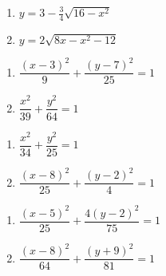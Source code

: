 \documentclass{ximera}
\begin{document}
\begin{multicols}{2}
\begin{enumerate}
\setcounter{enumi}{\value{HW}}

\item $y = 3 - \frac{3}{4} \sqrt{16-x^2}$

\item  $y = 2 \sqrt{8x-x^2-12}$ 

\setcounter{HW}{\value{enumi}}
\end{enumerate}
\end{multicols}

\begin{multicols}{2}
\begin{enumerate}
\setcounter{enumi}{\value{HW}}

\item $\dfrac{(x - 3)^{2}}{9} + \dfrac{(y - 7)^{2}}{25} = 1$
\item $\dfrac{x^{2}}{39} + \dfrac{y^{2}}{64} = 1$


\setcounter{HW}{\value{enumi}}
\end{enumerate}
\end{multicols}



\begin{multicols}{2}
\begin{enumerate}
\setcounter{enumi}{\value{HW}}

\item $\dfrac{x^{2}}{34} + \dfrac{y^{2}}{25} = 1$
\item $\dfrac{(x - 8)^{2}}{25} + \dfrac{(y - 2)^{2}}{4} = 1$

\setcounter{HW}{\value{enumi}}
\end{enumerate}
\end{multicols}

\begin{multicols}{2}
\begin{enumerate}
\setcounter{enumi}{\value{HW}}

\item $\dfrac{(x-5)^{2}}{25} + \dfrac{4(y-2)^{2}}{75} = 1$
\item $\dfrac{(x - 8)^{2}}{64} + \dfrac{(y + 9)^{2}}{81} = 1$

\setcounter{HW}{\value{enumi}}
\end{enumerate}
\end{multicols}
\end{document}
